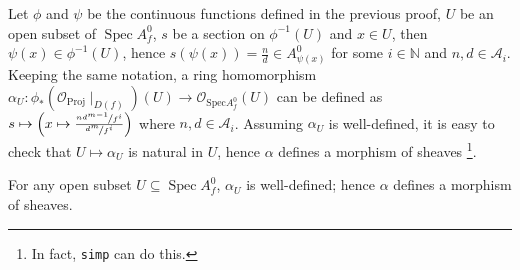\documentclass[a4paper,UKenglish,cleveref, autoref, thm-restate]{lipics-v2021}
\begin{document}
Let $\phi$ and $\psi$ be the continuous functions defined in the previous proof, $U$ be an open subset of $\operatorname{Spec}A^0_f$, $s$ be a section on $\phi^{-1}(U)$ and $x \in U$, then $\psi(x)\in \phi^{-1}(U)$, hence $s(\psi(x))=\frac n d\in A^0_{\psi(x)}$ for some $i\in\mathbb{N}$ and $n, d \in \mathcal{A}_i$. Keeping the same notation, a ring homomorphism $\alpha_U:\phi_*(\mathcal O_{\mathrm{Proj}}\!\mid_{D(f)})(U)\to \mathcal O_{\mathrm{Spec}A^0_f}(U)$ can be defined as $s\mapsto \left(x\mapsto \frac{\nicefrac{nd^{m-1}}{f^i}}{\nicefrac{d^m}{f^i}}\right)$ where $n, d\in\mathcal{A}_i$.  Assuming $\alpha_U$ is well-defined, it is easy to check that $U\mapsto \alpha_U$ is natural in $U$, hence $\alpha$ defines a morphism of sheaves \footnote{In fact, \lstinline{simp} can do this.}.
\begin{lemma}\label{thm:def-alpha}
    For any open subset $U\subseteq \operatorname{Spec}A^0_f$, $\alpha_U$ is well-defined; hence $\alpha$ defines a morphism of sheaves.
\end{lemma}
\end{document}
